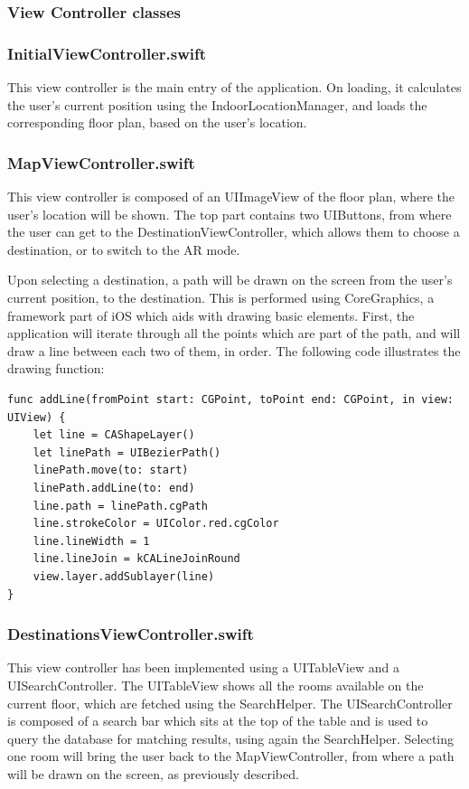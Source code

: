 \subsubsection{View Controller classes}
\subsubsection*{InitialViewController.swift}
This view controller is the main entry of the application. On loading, it calculates the user's current position using the IndoorLocationManager, and loads the corresponding floor plan, based on the user's location.

\subsubsection*{MapViewController.swift}
This view controller is composed of an UIImageView of the floor plan, where the user's location will be shown. The top part contains two UIButtons, from where the user can get to the DestinationViewController, which allows them to choose a destination, or to switch to the AR mode.

Upon selecting a destination, a path will be drawn on the screen from the user's current position, to the destination. This is performed using CoreGraphics, a framework part of iOS which aids with drawing basic elements. First, the application will iterate through all the points which are part of the path, and will draw a line between each two of them, in order. The following code illustrates the drawing function:

\begin{lstlisting}
func addLine(fromPoint start: CGPoint, toPoint end: CGPoint, in view: UIView) {
	let line = CAShapeLayer()
    let linePath = UIBezierPath()
    linePath.move(to: start)
    linePath.addLine(to: end)
    line.path = linePath.cgPath
    line.strokeColor = UIColor.red.cgColor
    line.lineWidth = 1
    line.lineJoin = kCALineJoinRound
    view.layer.addSublayer(line)
}
\end{lstlisting}

\subsubsection*{DestinationsViewController.swift}
This view controller has been implemented using a UITableView and a UISearchController. The UITableView shows all the rooms available on the current floor, which are fetched using the SearchHelper. The UISearchController is composed of a search bar which sits at the top of the table and is used to query the database for matching results, using again the SearchHelper. Selecting one room will bring the user back to the MapViewController, from where a path will be drawn on the screen, as previously described.


